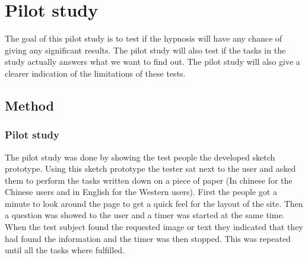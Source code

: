 
\chapter{Pilot study} %

\label{Chapter6} %

The goal of this pilot study is to test if the hypnosis will have any chance of giving any significant results. The pilot study will also test if the tasks in the study actually answers what we want to find out. The pilot study will also give a clearer indication of the limitations of these tests.
\section{Method}
\subsection{Pilot study}
The pilot study was done by showing the test people the developed sketch prototype. Using this sketch prototype the tester sat next to the user and asked them to perform the tasks written down on a piece of paper (In chinese for the Chinese users and in English for the Western users). First the people got a minute to look around the page to get a quick feel for the layout of the site. Then a question was showed to the user and a timer was started at the same time. When the test subject found the requested image or text they indicated that they had found the information and the timer was then stopped. This was repeated until all the tasks where fulfilled.

